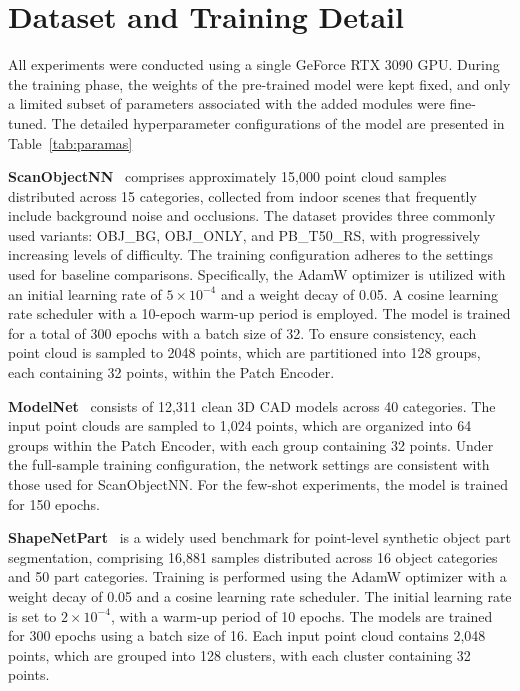 \clearpage
\setcounter{page}{1}
\maketitlesupplementary
\appendix

\section{Dataset and Training Detail}

All experiments were conducted using a single GeForce RTX 3090 GPU. During the training phase, the weights of the pre-trained model were kept fixed, and only a limited subset of parameters associated with the added modules were fine-tuned. The detailed hyperparameter configurations of the model are presented in Table~\ref{tab:paramas}

\textbf{ScanObjectNN}~\cite{uy2019revisiting} comprises approximately 15,000 point cloud samples distributed across 15 categories, collected from indoor scenes that frequently include background noise and occlusions. The dataset provides three commonly used variants: OBJ\_BG, OBJ\_ONLY, and PB\_T50\_RS, with progressively increasing levels of difficulty. The training configuration adheres to the settings used for baseline comparisons. Specifically, the AdamW optimizer is utilized with an initial learning rate of $5 \times 10^{-4}$ and a weight decay of 0.05. A cosine learning rate scheduler with a 10-epoch warm-up period is employed. The model is trained for a total of 300 epochs with a batch size of 32. To ensure consistency, each point cloud is sampled to 2048 points, which are partitioned into 128 groups, each containing 32 points, within the Patch Encoder.

\textbf{ModelNet}~\cite{wu20153d} consists of 12,311 clean 3D CAD models across 40 categories. The input point clouds are sampled to 1,024 points, which are organized into 64 groups within the Patch Encoder, with each group containing 32 points. Under the full-sample training configuration, the network settings are consistent with those used for ScanObjectNN. For the few-shot experiments, the model is trained for 150 epochs.

\textbf{ShapeNetPart}~\cite{yi2016scalable} is a widely used benchmark for point-level synthetic object part segmentation, comprising 16,881 samples distributed across 16 object categories and 50 part categories. Training is performed using the AdamW optimizer with a weight decay of 0.05 and a cosine learning rate scheduler. The initial learning rate is set to $2 \times 10^{-4}$, with a warm-up period of 10 epochs. The models are trained for 300 epochs using a batch size of 16. Each input point cloud contains 2,048 points, which are grouped into 128 clusters, with each cluster containing 32 points.

